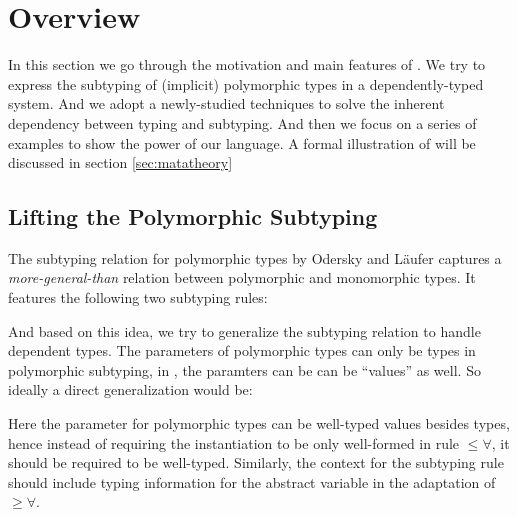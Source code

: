 \section{Overview}

In this section we go through the motivation and main features of \name. We
try to express the subtyping of (implicit) polymorphic types in a dependently-typed
system. And we adopt a newly-studied techniques to solve the inherent dependency
between typing and subtyping. And then we focus on a series of examples to show
the power of our language. A formal illustration of \name will be discussed in
section \ref{sec:matatheory}

\subsection{Lifting the Polymorphic Subtyping}
\label{sec:polymorphic-subtyping}

The subtyping relation for polymorphic types by Odersky and L\"aufer\cite{odersky1996putting}
captures a \emph{more-general-than} relation between polymorphic and monomorphic
types. It features the following two subtyping rules:


And based on this idea, we try to generalize the subtyping relation to handle
dependent types. The parameters of polymorphic types can only be types in
polymorphic subtyping, in \name, the paramters can be can be ``values'' as well.
So ideally a direct generalization would be:


Here the parameter for polymorphic types can be well-typed values besides types,
hence instead of requiring the instantiation to be only well-formed in rule
$\le\forall$, it should be required to be well-typed. Similarly, the context
for the subtyping rule should include typing information for the abstract variable
in the adaptation of $\ge\forall$.

